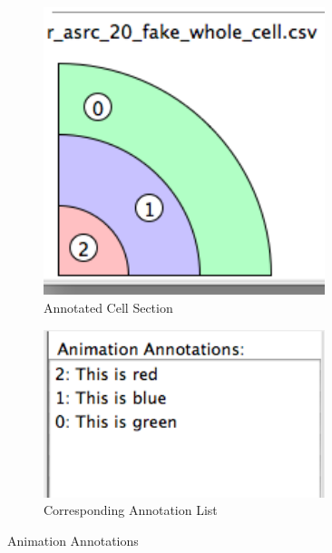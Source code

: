 \begin{figure}[h!]
    \centering
    \begin{subfigure}[b]{0.4\textwidth}
        \centering
        \includegraphics[width=0.9\textwidth]{images/annotation_whole_b.png}
        \caption{Annotated Cell Section}
        \label{fig:annotation_whole_cell}
    \end{subfigure}
    \begin{subfigure}[b]{0.4\textwidth}
        \centering
        \includegraphics[width=0.9\textwidth]{images/annotation_whole_a.png}
        \caption{Corresponding Annotation List}
        \label{fig:annotation_whole_list}
    \end{subfigure}
    \caption{Animation Annotations}
    \label{fig:annotation_whole}
\end{figure}

